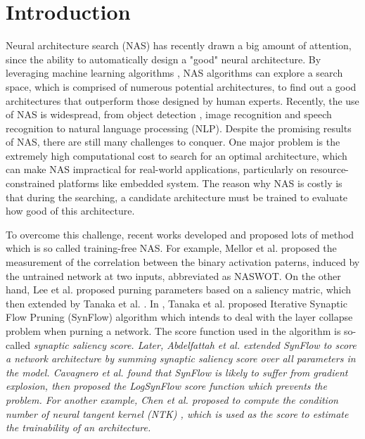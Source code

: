 \documentclass[sigconf]{acmart}
\begin{document}
\section{Introduction}
\label{sec:introduction}

    Neural architecture search (NAS) has recently drawn a big amount of 
    attention, since the ability to automatically design a "good" neural 
    architecture. By leveraging machine learning algorithms 
    \cite{https://doi.org/10.48550/arxiv.1611.01578}, NAS algorithms can 
    explore a search space, which is comprised of numerous potential 
    architectures, to find out a good architectures that outperform those 
    designed by human experts. Recently, the use of NAS is widespread, 
    from object detection \cite{https://doi.org/10.48550/arxiv.2111.13336}, 
    image recognition \cite{https://doi.org/10.48550/arxiv.2006.04647} 
    and speech recognition \cite{https://doi.org/10.48550/arxiv.2011.05649} 
    \cite{mehrotra2021nasbenchasr} to natural language processing (NLP). 
    \cite{jiang-etal-2019-improved} \cite{https://doi.org/10.48550/arxiv.2006.07116} 
    \cite{https://doi.org/10.48550/arxiv.2005.14187} 
    Despite the promising results of NAS, there are still many challenges 
    to conquer. One major problem is the extremely high computational 
    cost to search for an optimal architecture, which can make NAS 
    impractical for real-world applications, particularly on resource-constrained 
    platforms like embedded system. The reason why NAS is costly is that 
    during the searching, a candidate architecture must be trained to 
    evaluate how good of this architecture. 

    To overcome this challenge, recent works developed and proposed lots 
    of method which is so called training-free NAS. 
    For example, Mellor et al. \cite{https://doi.org/10.48550/arxiv.2006.04647} 
    proposed the measurement of the correlation between the binary 
    activation paterns, induced by the untrained network at two inputs, 
    abbreviated as NASWOT. 
    On the other hand, Lee et al. \cite{lee2019snip} proposed purning 
    parameters based on a saliency matric, which then extended by Tanaka 
    et al. \cite{tanaka2020pruning}. In \cite{tanaka2020pruning}, Tanaka 
    et al. proposed Iterative Synaptic Flow Pruning (SynFlow) algorithm 
    which intends to deal with the layer collapse problem when purning a 
    network. The score function used in the algorithm is so-called 
    \it{synaptic saliency} \rm{score}. Later, Abdelfattah et al. 
    \cite{abdelfattah2021zerocost} extended SynFlow to score a network 
    architecture by summing synaptic saliency score over all parameters 
    in the model. Cavagnero et al. \cite{Cavagnero_2023} found that 
    SynFlow is likely to suffer from gradient explosion, then proposed 
    the LogSynFlow score function which prevents the problem. 
    For another example, Chen et al. 
    \cite{https://doi.org/10.48550/arxiv.2102.11535} proposed to compute 
    the condition number of neural tangent kernel (NTK) 
    \cite{https://doi.org/10.48550/arxiv.2203.09137} 
    \cite{https://doi.org/10.48550/arxiv.2109.00817}, which is used as 
    the score to estimate the trainability of an architecture. 
\end{document}
